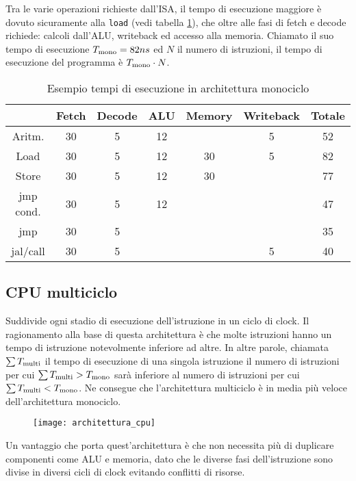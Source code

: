 \documentclass[../ace.tex]{subfiles}
\begin{document}
Tra le varie operazioni richieste dall'ISA, il tempo di esecuzione maggiore è dovuto sicuramente alla \lstinline{load} (vedi
tabella \ref{tab:tempi_esecuzione_monociclo}),
che oltre alle fasi di fetch e decode richiede: calcoli dall'ALU, writeback ed accesso alla memoria.
Chiamato il suo tempo di esecuzione $T_\text{mono}=82ns$ ed $N$ il numero di istruzioni, il tempo di esecuzione del programma è $T_\text{mono} \cdot N$.

\begin{table}[h]
    \centering
    \begin{tabular}{|c|c|c|c|c|c|c|}
        \hline
    & Fetch  & Decode & ALU & Memory & Writeback & Totale \\
    \hline
        Aritm.   & 30 & 5 &  12 &        &         5 &      52\\
        Load     & 30 & 5 &  12 &     30 &         5 &      82\\
        Store    & 30 & 5 &  12 &     30 &           &      77\\
        jmp cond.& 30 & 5 &  12 &        &           &      47\\
        jmp      & 30 & 5 &     &        &           &      35\\
        jal/call & 30 & 5 &     &        &         5 &      40\\
        \hline
    \end{tabular}
    \caption{Esempio tempi di esecuzione in architettura monociclo}
    \label{tab:tempi_esecuzione_monociclo}
\end{table}

\subsection{CPU multiciclo}
Suddivide ogni stadio di esecuzione dell'istruzione in un ciclo di clock.
Il ragionamento alla base di questa architettura è che molte istruzioni hanno un tempo di istruzione notevolmente inferiore ad altre.
In altre parole, chiamata $\sum T_\text{multi}$ il tempo di esecuzione di una singola istruzione il numero di istruzioni per cui
$\sum T_\text{multi} > T_\text{mono}$ sarà inferiore al numero di istruzioni per cui $\sum T_\text{multi} < T_\text{mono}$.
Ne consegue che l'architettura multiciclo è in media più veloce dell'architettura monociclo.

\begin{figure}[h]
    \centering
    \texttt{[image: architettura\_cpu]}
\end{figure}
Un vantaggio che porta quest'architettura è che non necessita più di duplicare componenti come ALU e memoria, dato che le diverse fasi dell'istruzione sono divise in diversi cicli di clock evitando conflitti di risorse.
\end{document}
